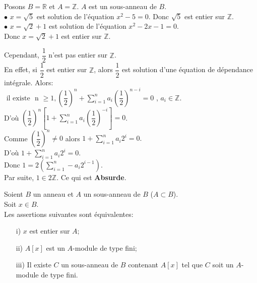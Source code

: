 \begin{monexemple}
	Posons $B = \mathbb{R}$ et $A = \mathbb{Z}$. $A$ est un sous-anneau de $B$.\\
	$\bullet$ $x = \sqrt{5}$ est solution de l'équation $x^2 - 5=0$. Donc $\sqrt{5}$ est entier sur $\mathbb{Z}$.\\
	$\bullet$ $x = \sqrt{2}+1$ est solution de l'équation $x^2 - 2x -1=0$.\\Donc $x = \sqrt{2}+1$ est entier sur $\mathbb{Z}$.\\
\end{monexemple}
\begin{moncontreexemple}
	Cependant, $\dfrac{1}{2}$ n'est pas entier sur $\mathbb{Z}$.\\
	En effet, si $\dfrac{1}{2}$ est entier sur $\mathbb{Z}$, alors $\dfrac{1}{2}$ est solution d'une équation de dépendance intégrale. Alors: \\
	$\text{ il existe }$ n $\geq 1 , \left(\dfrac{1}{2} \right)^n + \sum\limits_{i=1}^{n} a_i \left(\dfrac{1}{2} \right)^{n-i} = 0$ , $a_i \in\mathbb{Z}$.\\
	D'où $\left(\dfrac{1}{2} \right)^n \left[1+\sum\limits_{i=1}^{n} a_i \left(\dfrac{1}{2} \right)^{-i}\right] = 0$.\\
	Comme $\left(\dfrac{1}{2} \right)^n \neq 0$ alors $1+\sum\limits_{i=1}^{n} a_i2^{i} = 0.$\\D'où $1+\sum\limits_{i=1}^{n} a_i2^{i} = 0.$\\ Donc $1 = 2\left(\sum\limits_{i=1}^{n} -a_i 2^{i-1}\right).$\\Par suite, $ 1\in 2\mathbb{Z}.$ Ce qui est \textbf{Absurde}.
\end{moncontreexemple}
\begin{maproposition}
	\label{maprop12}
	Soient $B$ un anneau et $A$ un sous-anneau de $B$ ($A \subset B$).\\
	Soit $x \in B$. \\
	Les assertions suivantes sont équivalentes:
	\begin{enumerate}
		\item[i)]$x$ est entier sur $A$;
		\item[ii)]$A\left[ x\right]$ est un $A$-module de type fini;
		\item[iii)]Il existe $C$ un sous-anneau de $B$ contenant $A\left[ x\right]$ tel que $C$ soit un $A$-module de type fini.
	\end{enumerate}
\end{maproposition}
